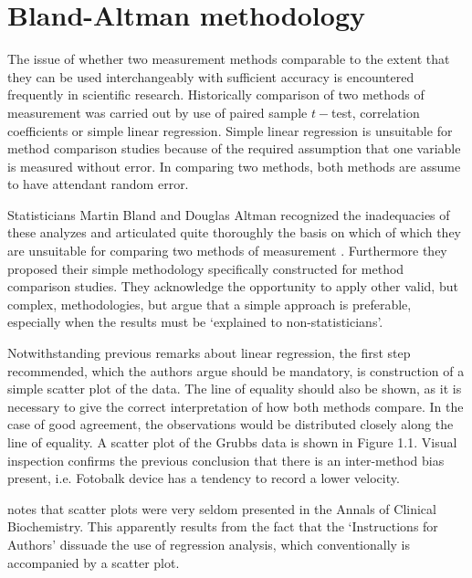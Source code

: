 \documentclass[Main.tex]{subfiles}
\begin{document}
\section{Bland-Altman methodology}
The issue of whether two measurement methods comparable to the
extent that they can be used interchangeably with sufficient
accuracy is encountered frequently in scientific research.
Historically comparison of two methods of measurement was carried
out by use of paired sample $t-$test, correlation coefficients or
simple linear regression. Simple linear regression is unsuitable for method comparison studies because of the required assumption that one variable is measured without error. In comparing two methods, both methods are assume to have attendant random error.

Statisticians Martin Bland and Douglas Altman recognized the inadequacies of these analyzes and
articulated quite thoroughly the basis on which of which they are unsuitable for comparing two methods of measurement \citep*{BA83}. Furthermore they proposed their simple methodology specifically
constructed for method comparison studies. They acknowledge the opportunity to apply other valid, but complex, methodologies, but argue that a simple approach is preferable, especially when the
results must be `explained to non-statisticians'.

Notwithstanding previous remarks about linear regression, the first step recommended, which the authors argue should be mandatory, is construction of a simple scatter plot of the data. The line of equality should also be shown, as it is necessary to give the correct interpretation of how both methods compare. In the case of good agreement, the observations would be distributed closely along the line of equality. A scatter plot of the Grubbs data is shown in Figure 1.1. Visual inspection confirms the previous conclusion that there is an inter-method bias present, i.e. Fotobalk device has a tendency to record a lower velocity.


\citet{Dewitte} notes that scatter plots were very seldom
presented in the Annals of Clinical Biochemistry. This apparently
results from the fact that the `Instructions for Authors' dissuade
the use of regression analysis, which conventionally is
accompanied by a scatter plot.
\end{document}
